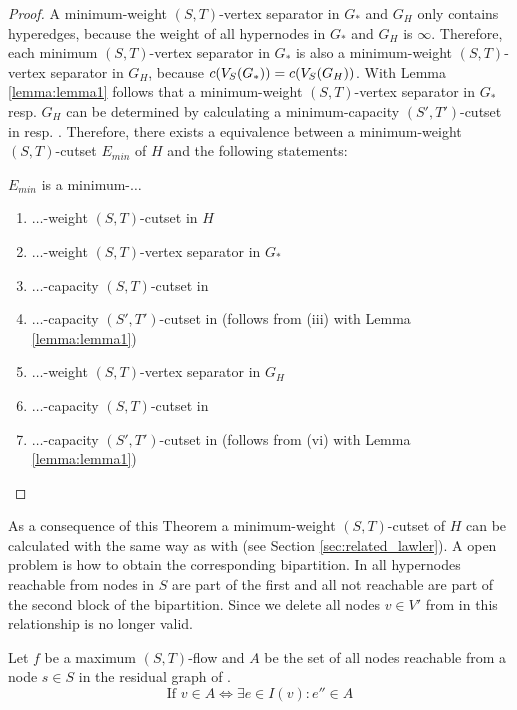 \begin{proof}
A minimum-weight $(S,T)$-vertex separator in $G_*$ and $G_H$ only contains hyperedges, because
the weight of all hypernodes in $G_*$ and $G_H$ is $\infty$. Therefore, each minimum
$(S,T)$-vertex separator in $G_*$ is also a minimum-weight $(S,T)$-vertex separator in $G_H$,
because $c(V_S(G_*)) = c(V_S(G_H))$. With Lemma \ref{lemma:lemma1} follows that
a minimum-weight $(S,T)$-vertex separator in $G_*$ resp. $G_H$  can be determined by 
calculating a minimum-capacity $(S',T')$-cutset in  resp. . 
Therefore, there exists a equivalence between a minimum-weight $(S,T)$-cutset 
$E_{min}$ of $H$ and the following statements: 

$E_{min}$ is a minimum-$\ldots$
\begin{enumerate}
\item $\ldots$-weight $(S,T)$-cutset in $H$
\item $\ldots$-weight $(S,T)$-vertex separator in $G_*$
\item $\ldots$-capacity $(S,T)$-cutset in 
\item $\ldots$-capacity $(S',T')$-cutset in  (follows from (iii) with Lemma \ref{lemma:lemma1})
\item $\ldots$-weight $(S,T)$-vertex separator in $G_H$
\item $\ldots$-capacity $(S,T)$-cutset in 
\item $\ldots$-capacity $(S',T')$-cutset in  (follows from (vi) with Lemma \ref{lemma:lemma1})
\end{enumerate}

\end{proof}

As a consequence of this Theorem a minimum-weight $(S,T)$-cutset of $H$ can be calculated with
 the same way as with  (see Section \ref{sec:related_lawler}). A open
problem is how to obtain the corresponding bipartition. In  all hypernodes
reachable from nodes in $S$ are part of the first and all not reachable are part of the
second block of the bipartition. Since we delete all nodes $v \in V'$ from  
in  this relationship is no longer valid. 

\begin{lemma}
\label{lemma:bipartition_construction}
Let $f$ be a maximum $(S,T)$-flow and $A$ be the set of all nodes reachable
from a node $s \in S$ in the residual graph of .
\[ \text{If } v \in A \Leftrightarrow \exists e \in I(v): e'' \in A \]
\end{lemma}

